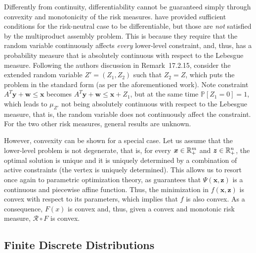 \documentclass[12pt]{article}
\begin{document}
Differently from continuity, differentiability cannot be guaranteed simply through convexity and monotonicity of the risk measures.
\citet[Proposition~17.2.13]{burtscheidtRiskAverseModelsBilevel2020} have provided sufficient conditions for the risk-neutral case to be differentiable, but those are \emph{not} satisfied by the multiproduct assembly problem.
This is because they require that the random variable continuously affects \emph{every} lower-level constraint, and, thus, has a probability measure that is absolutely continuous with respect to the Lebesgue measure.
Following the authors discussion in Remark~17.2.15, consider the extended random variable $Z'=(Z_1,Z_2)$ such that $Z_2=Z$, which puts the problem in the standard form (as per the aforementioned work).
Note constraint $A^{T}\bm{y} + \bm{w} \le \bm{x}$ becomes $A^{T}\bm{y} + \bm{w} \le \bm{x} + Z_1$, but at the same time $\mathbb{P}[Z_1=0]=1$, which leads to $\mu_{Z'}$ not being absolutely continuous with respect to the Lebesgue measure, that is, the random variable does not continuously affect the constraint.
For the two other risk measures, general results are unknown.

However, convexity can be shown for a special case.
Let us assume that the lower-level problem is not degenerate, that is, for every $\bm{x} \in \mathbb{R}^{m}_{+}$ and $\bm{z}\in \mathbb{R}^{n}_{+}$, the optimal solution is unique and it is uniquely determined by a combination of active constraints (the vertex is uniquely determined).
This allows us to resort once again to parametric optimization theory, as \citep[Theorem~2.1]{pistikopoulosMultiparametricOptimizationControl2021} guarantees that $\Psi(\bm{x},\bm{z})$ is a continuous and piecewise affine function.
Thus, the minimization in $f(\bm{x},\bm{z})$ is convex with respect to its parameters, which implies that $f$ is also convex.
As a consequence, $F(x)$ is convex and, thus, given a convex and monotonic risk measure, $\mathcal{R} \circ F$ is convex.



\subsection*{Finite Discrete Distributions}
\end{document}
